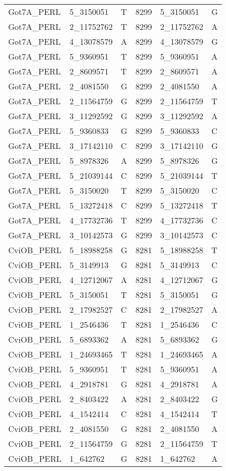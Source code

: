 \begin{center}
\begin{longtable}{|l|l|l|l|l|l|}
Got7A\_PERL&5\_3150051&T&8299&5\_3150051&G\\
Got7A\_PERL&2\_11752762&T&8299&2\_11752762&A\\
Got7A\_PERL&4\_13078579&A&8299&4\_13078579&G\\
Got7A\_PERL&5\_9360951&T&8299&5\_9360951&A\\
Got7A\_PERL&2\_8609571&T&8299&2\_8609571&A\\
Got7A\_PERL&2\_4081550&G&8299&2\_4081550&A\\
Got7A\_PERL&2\_11564759&G&8299&2\_11564759&T\\
Got7A\_PERL&3\_11292592&G&8299&3\_11292592&A\\
Got7A\_PERL&5\_9360833&G&8299&5\_9360833&C\\
Got7A\_PERL&3\_17142110&C&8299&3\_17142110&G\\
Got7A\_PERL&5\_8978326&A&8299&5\_8978326&G\\
Got7A\_PERL&5\_21039144&C&8299&5\_21039144&T\\
Got7A\_PERL&5\_3150020&T&8299&5\_3150020&C\\
Got7A\_PERL&5\_13272418&C&8299&5\_13272418&T\\
Got7A\_PERL&4\_17732736&T&8299&4\_17732736&C\\
Got7A\_PERL&3\_10142573&G&8299&3\_10142573&C\\
CviOB\_PERL&5\_18988258&G&8281&5\_18988258&T\\
CviOB\_PERL&5\_3149913&G&8281&5\_3149913&C\\
CviOB\_PERL&4\_12712067&A&8281&4\_12712067&G\\
CviOB\_PERL&5\_3150051&T&8281&5\_3150051&G\\
CviOB\_PERL&2\_17982527&C&8281&2\_17982527&A\\
CviOB\_PERL&1\_2546436&T&8281&1\_2546436&C\\
CviOB\_PERL&5\_6893362&A&8281&5\_6893362&G\\
CviOB\_PERL&1\_24693465&T&8281&1\_24693465&A\\
CviOB\_PERL&5\_9360951&T&8281&5\_9360951&A\\
CviOB\_PERL&4\_2918781&G&8281&4\_2918781&A\\
CviOB\_PERL&2\_8403422&A&8281&2\_8403422&G\\
CviOB\_PERL&4\_1542414&C&8281&4\_1542414&T\\
CviOB\_PERL&2\_4081550&G&8281&2\_4081550&A\\
CviOB\_PERL&2\_11564759&G&8281&2\_11564759&T\\
CviOB\_PERL&1\_642762&G&8281&1\_642762&A\\

\end{longtable}
\end{center}
